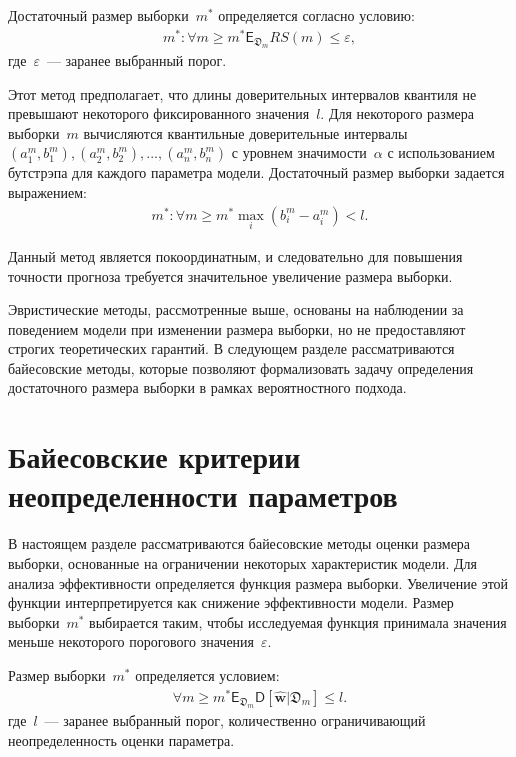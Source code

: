 Достаточный размер выборки~$m^*$ определяется согласно условию:
\[
\label{eq:hb:7}
\begin{aligned}
	m^*: \forall m \geq m^* \mathsf{E}_{\mathfrak{D}_{m}}RS(m) \leq \varepsilon,
\end{aligned}
\]
где~$\varepsilon$~--- заранее выбранный порог.

Этот метод предполагает, что длины доверительных интервалов квантиля не превышают некоторого фиксированного значения~$l$. Для некоторого размера выборки~$m$ вычисляются квантильные доверительные интервалы~$\left (a^m_1, b^m_1\right), \left(a^m_2, b^m_2 \right), ..., \left(a^m_n, b^m_n \right)$ с уровнем значимости~$\alpha$ с использованием бутстрэпа для каждого параметра модели. Достаточный размер выборки задается выражением:
\[
\label{eq:hb:8}
\begin{aligned}
	m^*: \forall m\geq m^* \max_i\left(b^m_i - a^m_i\right) < l.
\end{aligned}
\]

Данный метод является покоординатным, и следовательно для повышения точности прогноза требуется значительное увеличение размера выборки.

Эвристические методы, рассмотренные выше, основаны на наблюдении за поведением модели при изменении размера выборки, но не предоставляют строгих теоретических гарантий. В следующем разделе рассматриваются байесовские методы, которые позволяют формализовать задачу определения достаточного размера выборки в рамках вероятностного подхода.

\section{Байесовские критерии неопределенности параметров}

В настоящем разделе рассматриваются байесовские методы оценки размера выборки, основанные на ограничении некоторых характеристик модели. Для анализа эффективности определяется функция размера выборки. Увеличение этой функции интерпретируется как снижение эффективности модели. Размер выборки~$m^*$ выбирается таким, чтобы исследуемая функция принимала значения меньше некоторого порогового значения~$\varepsilon$.

Размер выборки~$m^*$ определяется условием:
\[
\label{eq:bs:1}
\begin{aligned}
	\forall m \geq m^*    \mathsf{E}_{\mathfrak{D}_m}\mathsf{D}\left[\hat{\textbf{w}}|\mathfrak{D}_m\right] \leq l.
\end{aligned}
\]
где~$l$~--- заранее выбранный порог, количественно ограничивающий неопределенность оценки параметра.

